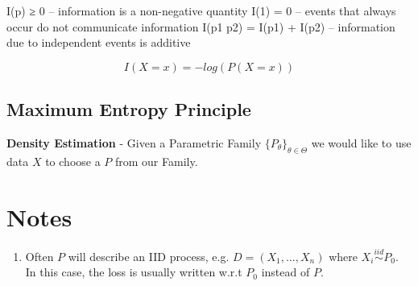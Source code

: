 \documentclass[]{article}
\begin{document}
I(p) ≥ 0 – information is a non-negative quantity
I(1) = 0 – events that always occur do not communicate information
I(p1 p2) = I(p1) + I(p2) – information due to independent events is additive

\begin{equation}
I(X=x) = -log(P(X=x))
\end{equation}

\subsection{Maximum Entropy Principle}
\textbf{Density Estimation} - Given a Parametric Family \(\{P_{\theta}\}_{\theta\in\Theta}\) we would like to use data \(X\) to choose a \(P\) from our Family.

\newpage

\section{Notes}
\begin{enumerate}
	\item \label{sec:ft1} Often $P$ will describe an IID process, e.g. $D = (X_1,...,X_n)$ where $X_i \overset{iid}\sim P_0$. In this case, the loss is usually written w.r.t $P_0$ instead of $P$.
\end{enumerate}



\end{document}

